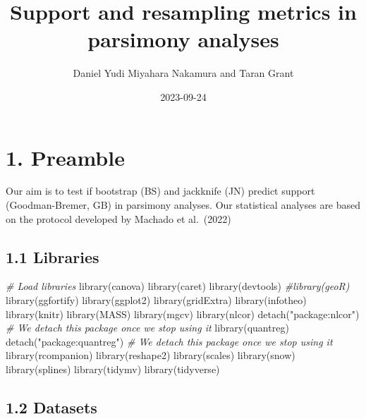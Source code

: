 \documentclass[
]{article}
\title{Support and resampling metrics in parsimony analyses}
\author{Daniel Yudi Miyahara Nakamura and Taran Grant}
\date{2023-09-24}
\newenvironment{Shaded}{\begin{snugshade}}{\end{snugshade}}
\newcommand{\CommentTok}[1]{\textcolor[rgb]{0.56,0.35,0.01}{\textit{#1}}}
\newcommand{\FunctionTok}[1]{\textcolor[rgb]{0.00,0.00,0.00}{#1}}
\newcommand{\NormalTok}[1]{#1}
\newcommand{\StringTok}[1]{\textcolor[rgb]{0.31,0.60,0.02}{#1}}
\begin{document}
\maketitle

\hypertarget{preamble}{%
\section{1. Preamble}\label{preamble}}

Our aim is to test if bootstrap (BS) and jackknife (JN) predict support
(Goodman-Bremer, GB) in parsimony analyses. Our statistical analyses are
based on the protocol developed by Machado et al.~(2022)

\hypertarget{libraries}{%
\subsection{1.1 Libraries}\label{libraries}}

\begin{Shaded}
\begin{Highlighting}[]
\CommentTok{\# Load libraries}
\FunctionTok{library}\NormalTok{(canova)}
\FunctionTok{library}\NormalTok{(caret)}
\FunctionTok{library}\NormalTok{(devtools)}
\CommentTok{\#library(geoR)}
\FunctionTok{library}\NormalTok{(ggfortify)}
\FunctionTok{library}\NormalTok{(ggplot2)}
\FunctionTok{library}\NormalTok{(gridExtra)}
\FunctionTok{library}\NormalTok{(infotheo)}
\FunctionTok{library}\NormalTok{(knitr)}
\FunctionTok{library}\NormalTok{(MASS)}
\FunctionTok{library}\NormalTok{(mgcv)}
\FunctionTok{library}\NormalTok{(nlcor)}
\FunctionTok{detach}\NormalTok{(}\StringTok{"package:nlcor"}\NormalTok{) }\CommentTok{\# We detach this package once we stop using it}
\FunctionTok{library}\NormalTok{(quantreg)}
\FunctionTok{detach}\NormalTok{(}\StringTok{"package:quantreg"}\NormalTok{) }\CommentTok{\# We detach this package once we stop using it}
\FunctionTok{library}\NormalTok{(rcompanion)}
\FunctionTok{library}\NormalTok{(reshape2)}
\FunctionTok{library}\NormalTok{(scales)}
\FunctionTok{library}\NormalTok{(snow)}
\FunctionTok{library}\NormalTok{(splines)}
\FunctionTok{library}\NormalTok{(tidymv)}
\FunctionTok{library}\NormalTok{(tidyverse)}
\end{Highlighting}
\end{Shaded}

\hypertarget{datasets}{%
\subsection{1.2 Datasets}\label{datasets}}
\end{document}
